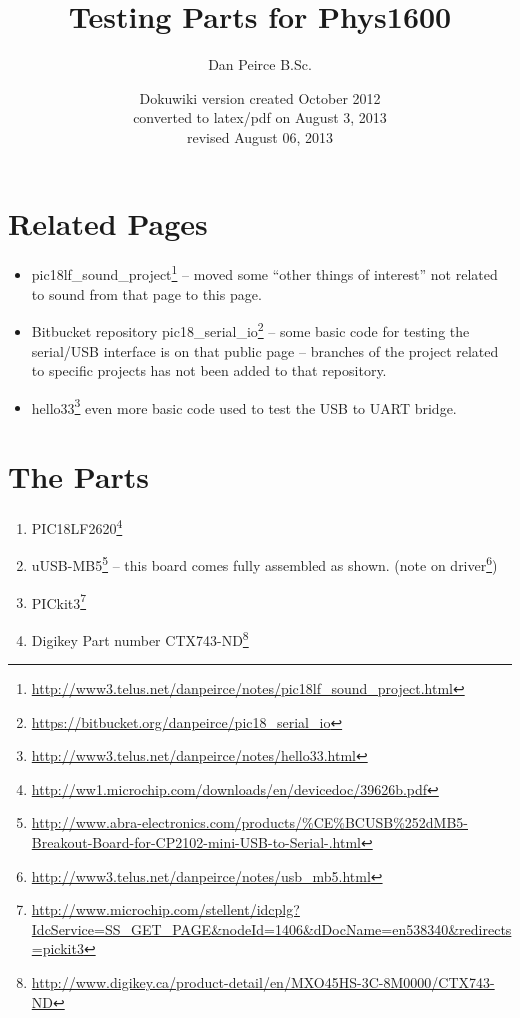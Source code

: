 \documentclass[twocolumn]{article}
\author{}
\date{}
\begin{document}
\title{Testing Parts for Phys1600}
\author{Dan Peirce B.Sc.}
\date{Dokuwiki version created October 2012 \\ converted to latex/pdf on August 3, 2013 \\ revised August 06, 2013}

\maketitle
\tableofcontents


\section{Related Pages}

\begin{itemize}
\item
  pic18lf\_sound\_project\footnote{\url{http://www3.telus.net/danpeirce/notes/pic18lf_sound_project.html}} -- moved
  some ``other things of interest'' not related to sound from that page
  to this page.
\item
  Bitbucket repository pic18\_serial\_io\footnote{\url{https://bitbucket.org/danpeirce/pic18_serial_io}} -- some basic
  code for testing the serial/USB interface is on that public page --
  branches of the project related to specific projects has not been
  added to that repository.
\item
  hello33\footnote{\url{http://www3.telus.net/danpeirce/notes/hello33.html}} even more basic code used to test the USB
  to UART bridge.
\end{itemize}


\section{The Parts}

\begin{enumerate}[1.]
\item
  PIC18LF2620\footnote{\url{http://ww1.microchip.com/downloads/en/devicedoc/39626b.pdf}}
\item
  uUSB-MB5\footnote{\tiny{\url{http://www.abra-electronics.com/products/\%CE\%BCUSB\%252dMB5-Breakout-Board-for-CP2102-mini-USB-to-Serial-.html}}}
  -- this board comes fully assembled as shown.
  (note on driver\footnote{\url{http://www3.telus.net/danpeirce/notes/usb_mb5.html}})
\item
  PICkit3\footnote{\url{http://www.microchip.com/stellent/idcplg?IdcService=SS\_GET\_PAGE\&nodeId=1406\&dDocName=en538340\&redirects=pickit3}}
\item
  Digikey Part number CTX743-ND\footnote{\url{http://www.digikey.ca/product-detail/en/MXO45HS-3C-8M0000/CTX743-ND}}
\end{enumerate}
\end{document}
